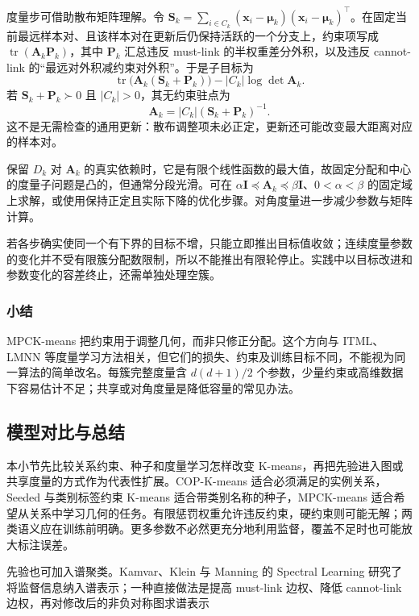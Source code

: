 度量步可借助散布矩阵理解。令 $\bm{S}_k=\sum_{i\in C_k}(\bm{x}_i-\bm{\mu}_k)(\bm{x}_i-\bm{\mu}_k)^\top$。在固定当前最远样本对、且该样本对在更新后仍保持活跃的一个分支上，约束项写成 $\operatorname{tr}(\bm{A}_k\bm{P}_k)$，其中 $\bm{P}_k$ 汇总违反 must-link 的半权重差分外积，以及违反 cannot-link 的“最远对外积减约束对外积”。于是子目标为
\[
 \operatorname{tr}\bigl(\bm{A}_k(\bm{S}_k+\bm{P}_k)\bigr)
 -|C_k|\log\det\bm{A}_k.
\]
若 $\bm{S}_k+\bm{P}_k\succ0$ 且 $|C_k|>0$，其无约束驻点为
\begin{equation}
 \bm{A}_k=|C_k|(\bm{S}_k+\bm{P}_k)^{-1}.
 \label{eq:clustering-mpck-metric}
\end{equation}
这不是无需检查的通用更新：散布调整项未必正定，更新还可能改变最大距离对应的样本对。

保留 $D_k$ 对 $\bm{A}_k$ 的真实依赖时，它是有限个线性函数的最大值，故固定分配和中心的度量子问题是凸的，但通常分段光滑。可在 $\alpha\bm{I}\preceq\bm{A}_k\preceq\beta\bm{I}$、$0<\alpha<\beta$ 的固定域上求解，或使用保持正定且实际下降的优化步骤。对角度量进一步减少参数与矩阵计算。

若各步确实使同一个有下界的目标不增，只能立即推出目标值收敛；连续度量参数的变化并不受有限簇分配数限制，所以不能推出有限轮停止。实践中以目标改进和参数变化的容差终止，还需单独处理空簇。

\subsubsection{小结}

MPCK-means 把约束用于调整几何，而非只修正分配。这个方向与 ITML、LMNN 等度量学习方法相关，但它们的损失、约束及训练目标不同，不能视为同一算法的简单改名。每簇完整度量含 $d(d+1)/2$ 个参数，少量约束或高维数据下容易估计不足；共享或对角度量是降低容量的常见办法。

\subsection{模型对比与总结}

本小节先比较关系约束、种子和度量学习怎样改变 K-means，再把先验进入图或共享度量的方式作为代表性扩展。COP-K-means 适合必须满足的实例关系，Seeded 与类别标签约束 K-means 适合带类别名称的种子，MPCK-means 适合希望从关系中学习几何的任务。有限惩罚权重允许违反约束，硬约束则可能无解；两类语义应在训练前明确。更多参数不必然更充分地利用监督，覆盖不足时也可能放大标注误差。

先验也可加入谱聚类。Kamvar、Klein 与 Manning 的 Spectral Learning 研究了将监督信息纳入谱表示；一种直接做法是提高 must-link 边权、降低 cannot-link 边权，再对修改后的非负对称图求谱表示

